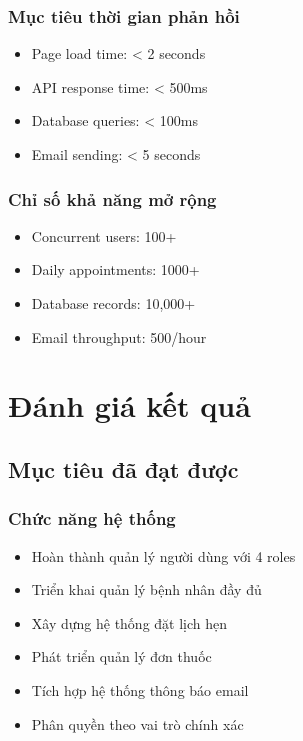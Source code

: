 \documentclass[12pt,a4paper]{report}
\begin{document}
\subsection{Mục tiêu thời gian phản hồi}
\begin{itemize}
    \item Page load time: < 2 seconds
    \item API response time: < 500ms
    \item Database queries: < 100ms
    \item Email sending: < 5 seconds
\end{itemize}

\subsection{Chỉ số khả năng mở rộng}
\begin{itemize}
    \item Concurrent users: 100+
    \item Daily appointments: 1000+
    \item Database records: 10,000+
    \item Email throughput: 500/hour
\end{itemize}

\chapter{Đánh giá kết quả}

\section{Mục tiêu đã đạt được}

\subsection{Chức năng hệ thống}
\begin{itemize}
    \item Hoàn thành quản lý người dùng với 4 roles
    \item Triển khai quản lý bệnh nhân đầy đủ
    \item Xây dựng hệ thống đặt lịch hẹn
    \item Phát triển quản lý đơn thuốc
    \item Tích hợp hệ thống thông báo email
    \item Phân quyền theo vai trò chính xác
\end{itemize}
\end{document}
